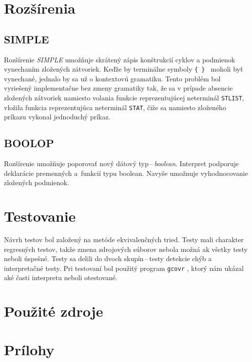 \documentclass[11pt,a4paper]{article}
\begin{document}
	\section{Rozšírenia}
	\label{rozsirenia}
	
	\subsection{SIMPLE}
	Rozšírenie \emph{SIMPLE} umožňuje skrátený zápis konštrukcií cyklov a
	podmienok vynechaním zložených zátvoriek. Keďže by terminálne symboly
	\texttt{\{ \} } moholi byť vynechané, jednalo by sa už o kontextovú gramatiku.
	Tento problém bol vyriešený implementačne bez zmeny
	gramatiky tak, že sa v prípade absencie zložených zátvoriek namiesto volania
	funkcie reprezentujúcej neterminál \texttt{STLIST}, vložila
	funkcia reprezentujúca neterminál \texttt{STAT}, čiže sa namiesto zloženého
	príkazu vykonal jednoduchý príkaz.
	
	\subsection{BOOLOP}
	Rozšírenie umožňuje poporovať nový dátový typ\,--\,\emph{boolean}. Interpret
	podporuje deklarácie premenných a~funkcií typu boolean. Navyše
	umožnuje vyhodnocovanie zložených podmienok.
	
	\section{Testovanie}
	\label{testovanie}
	Návrh testov bol založený na metóde ekvivalenčných tried. Testy mali charakter
	regresných testov, takže zmena zdrojových súborov nebola možná ak
	všetky testy neboli úspešné. Testy sa delili do dvoch skupín\,--\,testy
	detekcie chýb a interpretačné testy. Pri testovaní bol použitý program
	\texttt{gcovr} \cite{COV}, ktorý nám ukázal aké časti interpretu neboli otestované.
	
	\section{Použité zdroje}
	
	{}
	
	\newpage
	\section{Prílohy}
	
	
\end{document}
